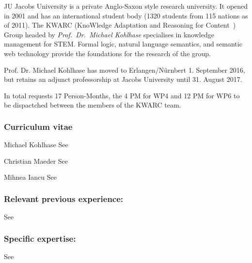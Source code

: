 \begin{sitedescription}{JU}
  Jacobs University is a private Anglo-Saxon style research university.  It opened in 2001
  and has an international student body (1320 students from 115 nations as of 2011).  The
  KWARC (KnoWledge Adaptation and Reasoning for Content~\cite{KWARC:online}) Group headed
  by {\emph{Prof.\ Dr.\ Michael Kohlhase}} specialises in knowledge management for STEM.
  Formal logic, natural language semantics, and semantic web technology provide the
  foundations for the research of the group.
  
  Prof. Dr. Michael Kohlhase has moved to  Erlangen/N\"urnbert 1. September
  2016, but retains an adjunct professorship at Jacobs University until 31. August 2017.  

  In total  requests 17 Person-Months, the 4 PM for WP4 and 12 PM for WP6 to be dispactched between the members of the KWARC team.

\subsubsection*{Curriculum vitae}

\begin{participant}[type=leadPI,gender=male,PM=0]{Michael Kohlhase}
  See 
\end{participant}

\begin{participant}[type=Res,gender=male,PM=5]{Christian Maeder}
  See 
\end{participant}
\begin{participant}[type=JRes,gender=male,PM=6]{Mihnea Iancu}
  See 
\end{participant}

\subsubsection*{Relevant previous experience:}
See 

\subsubsection*{Specific expertise:}
See 
\end{sitedescription}


